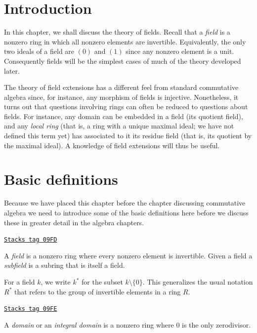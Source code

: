 \section{Introduction}
\label{fields-section-introduction}
In this chapter, we shall discuss the theory of fields. Recall that a
{\it field} is a nonzero ring in which all nonzero elements are invertible.
Equivalently, the only two ideals of a field are $(0)$ and $(1)$
since any nonzero element is a unit. Consequently fields will be the
simplest cases of much of the theory developed later.

\medskip\noindent
The theory of field extensions has a different feel from standard commutative
algebra since, for instance, any morphism of fields is injective. Nonetheless,
it turns out that questions involving rings can often be reduced to questions
about fields. For instance, any domain can be embedded in a field
(its quotient field), and any {\it local ring} (that is, a ring with a unique
maximal ideal; we have not defined this term yet) has associated to it its
residue field (that is, its quotient by the maximal ideal).
A knowledge of field extensions will thus be useful.

\section{Basic definitions}
\label{fields-section-definitions}
Because we have placed this chapter before the chapter discussing
commutative algebra we need to introduce some of the basic definitions
here before we discuss these in greater detail in the algebra chapters.

\begin{definition}[Field]
\label{fields-definition-field}
\href{https://stacks.math.columbia.edu/tag/09FD}{\texttt{Stacks tag 09FD}}

A {\it field} is a nonzero ring where every nonzero element is invertible.
Given a field a {\it subfield} is a subring that is itself a field.
\end{definition}

For a field $k$, we write $k^*$ for the subset $k \setminus \{0\}$.
This generalizes the usual notation $R^*$ that refers to the group of
invertible elements in a ring $R$.

\begin{definition}[Domain]
\label{fields-definition-domain}
\href{https://stacks.math.columbia.edu/tag/09FE}{\texttt{Stacks tag 09FE}}

A {\it domain} or an {\it integral domain} is a nonzero ring where $0$
is the only zerodivisor.
\end{definition}

